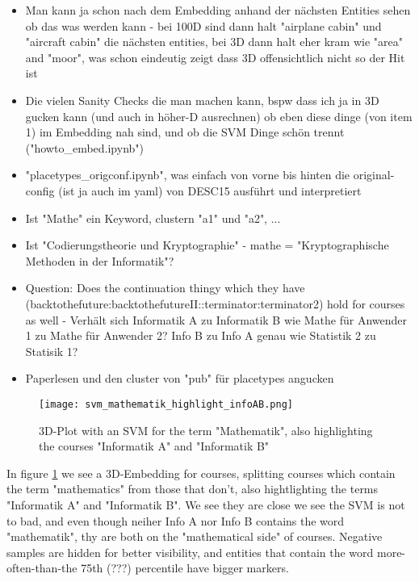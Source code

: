 \begin{itemize}
	\item  Man kann ja schon nach dem Embedding anhand der nächsten Entities sehen ob das was werden kann - bei 100D sind dann halt "airplane cabin" und "aircraft cabin" die nächsten entities, bei 3D dann halt eher kram wie "area" and "moor", was schon eindeutig zeigt dass 3D offensichtlich nicht so der Hit ist
	\item Die vielen Sanity Checks die man machen kann, bspw dass ich ja in 3D gucken kann (und auch in höher-D ausrechnen) ob eben diese dinge (von item 1) im Embedding nah sind, und ob die SVM Dinge schön trennt ("howto_embed.ipynb")
	\item "placetypes_origconf.ipynb", was einfach von vorne bis hinten die original-config (ist ja auch im yaml) von DESC15 ausführt und interpretiert	
\end{itemize}

\begin{itemize}
	\item Ist "Mathe" ein Keyword, clustern "a1" und "a2", ...
	\item Ist "Codierungstheorie und Kryptographie" - mathe = "Kryptographische Methoden in der Informatik"?
	\item Question: Does the continuation thingy which they have (backtothefuture:backtothefutureII::terminator:terminator2) hold for courses as well - Verhält sich Informatik A zu Informatik B wie Mathe für Anwender 1 zu Mathe für Anwender 2?  Info B zu Info A genau wie Statistik 2 zu Statisik 1? 
	\item Paperlesen und den cluster von "pub" für placetypes angucken
\end{itemize}


\begin{figure}[H]
	\centering
	\texttt{[image: svm\_mathematik\_highlight\_infoAB.png]}
	\caption[3D-Plot with an SVM for the term "Mathematik"]{
		\label{fig:3dplot_mathe_infoab}
		3D-Plot with an SVM for the term "Mathematik", also highlighting the courses "Informatik A" and "Informatik B"
	}
\end{figure}

In figure \ref{fig:3dplot_mathe_infoab} we see a 3D-Embedding for courses, splitting courses which contain the term "mathematics" from those that don't, also hightlighting the terms "Informatik A" and "Informatik B". We see they are close we see the SVM is not to bad, and even though neiher Info A nor Info B contains the word "mathematik", thy are both on the "mathematical side" of courses. Negative samples are hidden for better visibility, and entities that contain the word more-often-than-the 75th (???) percentile have bigger markers.


